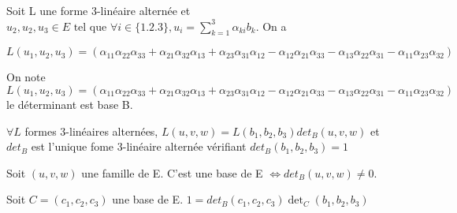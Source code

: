 \documentclass[french]{yLectureNote}
\newcommand{\tq}[0]{\text{ tel que }}
\begin{document}
\begin{proposition}
Soit L une forme 3-linéaire alternée et \(u_2,u_2,u_3\in E \tq \forall i \in \{1.2.3\}, u_i = \sum^3_{k = 1}\alpha_{ki}b_k\). On a

\(L(u_1,u_2,u_3) = (\alpha_{11}\alpha_{22}\alpha_{33}+\alpha_{21}\alpha_{32}\alpha_{13}+ \alpha_{23}\alpha_{31}\alpha_{12}-\alpha_{12}\alpha_{21}\alpha_{33}-\alpha_{13}\alpha_{22}\alpha_{31}-\alpha_{11}\alpha_{23}\alpha_{32})\)
\end{proposition}
\begin{definition}
On note \(L(u_1,u_2,u_3) = (\alpha_{11}\alpha_{22}\alpha_{33}+\alpha_{21}\alpha_{32}\alpha_{13}+ \alpha_{23}\alpha_{31}\alpha_{12}-\alpha_{12}\alpha_{21}\alpha_{33}-\alpha_{13}\alpha_{22}\alpha_{31}-\alpha_{11}\alpha_{23}\alpha_{32})\) le déterminant est base B.
\end{definition}
\begin{proposition}
\(\forall L\) formes 3-linéaires alternées, \(L(u,v,w) = L(b_1,b_2,b_3)det_B(u,v,w)\) et \(det_B\) est l'unique fome 3-linéaire alternée vérifiant \(det_B(b_1,b_2,b_3) = 1\)
\end{proposition}
\begin{proposition}
Soit \((u,v,w)\) une famille de E. C'est une base de E \(\iff det_B(u,v,w) \neq 0\).

Soit \(C = (c_1,c_2,c_3)\) une base de E. \(1 = det_B(c_1,c_2,c_3)\det_C(b_1,b_2,b_3)\)
\end{proposition}
\end{document}

